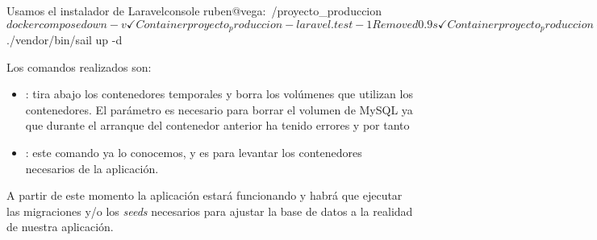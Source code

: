 \begin{mycode}{Usamos el instalador de Laravel}{console}{{\footnotesize}}
ruben@vega:~/proyecto_produccion$ docker compose down -v
✓ Container proyecto_produccion-laravel.test-1  Removed    0.9s
✓ Container proyecto_produccion-mysql-1         Removed    0.0s
✓ Volume proyecto_produccion-mysql              Removed    0.0s
✓ Network proyecto_produccion_sail              Removed

ruben@vega:~/proyecto_produccion$ ./vendor/bin/sail up -d
\end{mycode}

Los comandos realizados son:
\begin{itemize}
    \item {} : tira abajo los contenedores temporales y borra los volúmenes que utilizan los contenedores. El parámetro  es necesario para borrar el volumen de MySQL ya que durante el arranque del contenedor anterior ha tenido errores y por tanto

    \item {} : este comando ya lo conocemos, y es para levantar los contenedores necesarios de la aplicación.
\end{itemize}

A partir de este momento la aplicación estará funcionando y habrá que ejecutar las migraciones y/o los \textit{seeds} necesarios para ajustar la base de datos a la realidad de nuestra aplicación.